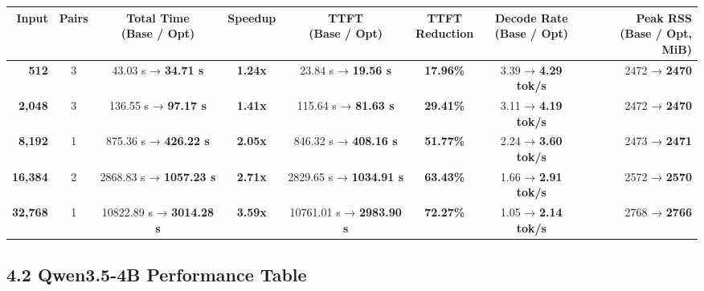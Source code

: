 \documentclass[10pt,a4paper]{article}
\begin{document}
\begin{scriptsize}
\setlength{\tabcolsep}{2.5pt}
\begin{tabular*}{\textwidth}{@{\extracolsep{\fill}}rccccccr@{}}
\toprule
\textbf{Input} & \textbf{Pairs} & \shortstack{\textbf{Total Time}\\\textbf{(Base / Opt)}} & \textbf{Speedup} & \shortstack{\textbf{TTFT}\\\textbf{(Base / Opt)}} & \shortstack{\textbf{TTFT}\\\textbf{Reduction}} & \shortstack{\textbf{Decode Rate}\\\textbf{(Base / Opt)}} & \shortstack{\textbf{Peak RSS}\\\textbf{(Base / Opt, MiB)}} \\
\midrule
\textbf{512} & 3 & 43.03 s → \textbf{34.71 s} & \textbf{1.24x} & 23.84 s → \textbf{19.56 s} & \textbf{17.96\%} & 3.39 → \textbf{4.29 tok/s} & 2472 → \textbf{2470} \\
\textbf{2,048} & 3 & 136.55 s → \textbf{97.17 s} & \textbf{1.41x} & 115.64 s → \textbf{81.63 s} & \textbf{29.41\%} & 3.11 → \textbf{4.19 tok/s} & 2472 → \textbf{2470} \\
\textbf{8,192} & 1 & 875.36 s → \textbf{426.22 s} & \textbf{2.05x} & 846.32 s → \textbf{408.16 s} & \textbf{51.77\%} & 2.24 → \textbf{3.60 tok/s} & 2473 → \textbf{2471} \\
\textbf{16,384} & 2 & 2868.83 s → \textbf{1057.23 s} & \textbf{2.71x} & 2829.65 s → \textbf{1034.91 s} & \textbf{63.43\%} & 1.66 → \textbf{2.91 tok/s} & 2572 → \textbf{2570} \\
\textbf{32,768} & 1 & 10822.89 s → \textbf{3014.28 s} & \textbf{3.59x} & 10761.01 s → \textbf{2983.90 s} & \textbf{72.27\%} & 1.05 → \textbf{2.14 tok/s} & 2768 → \textbf{2766} \\
\bottomrule
\end{tabular*}
\end{scriptsize}

\subsection{4.2 Qwen3.5-4B Performance Table}
\end{document}
